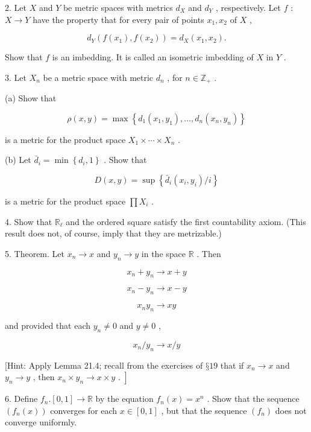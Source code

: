 2. Let \(X\) and \(Y\) be metric spaces with metrics \({d}_{X}\) and \({d}_{Y}\) , respectively. Let \(f\) : \(X \rightarrow  Y\) have the property that for every pair of points \({x}_{1},{x}_{2}\) of \(X\) ,

\[
{d}_{Y}\left( {f\left( {x}_{1}\right) ,f\left( {x}_{2}\right) }\right)  = {d}_{X}\left( {{x}_{1},{x}_{2}}\right) .
\]

Show that \(f\) is an imbedding. It is called an isometric imbedding of \(X\) in \(Y\) .

3. Let \({X}_{n}\) be a metric space with metric \({d}_{n}\) , for \(n \in  {\mathbb{Z}}_{ + }\) .

(a) Show that

\[
\rho \left( {x,y}\right)  = \max \left\{  {{d}_{1}\left( {{x}_{1},{y}_{1}}\right) ,\ldots ,{d}_{n}\left( {{x}_{n},{y}_{n}}\right) }\right\}
\]

is a metric for the product space \({X}_{1} \times  \cdots  \times  {X}_{n}\) .

(b) Let \({\bar{d}}_{i} = \min \left\{  {{d}_{i},1}\right\}\) . Show that

\[
D\left( {x,y}\right)  = \sup \left\{  {{\bar{d}}_{i}\left( {{x}_{i},{y}_{i}}\right) /i}\right\}
\]

is a metric for the product space \(\prod {X}_{i}\) .

4. Show that \({\mathbb{R}}_{\ell }\) and the ordered square satisfy the first countability axiom. (This result does not, of course, imply that they are metrizable.)

5. Theorem. Let \({x}_{n} \rightarrow  x\) and \({y}_{n} \rightarrow  y\) in the space \(\mathbb{R}\) . Then

\[
{x}_{n} + {y}_{n} \rightarrow  x + y
\]

\[
{x}_{n} - {y}_{n} \rightarrow  x - y
\]

\[
{x}_{n}{y}_{n} \rightarrow  {xy}
\]

and provided that each \({y}_{n} \neq  0\) and \(y \neq  0\) ,

\[
{x}_{n}/{y}_{n} \rightarrow  x/y
\]

[Hint: Apply Lemma 21.4; recall from the exercises of \(§{19}\) that if \({x}_{n} \rightarrow  x\) and \(\left. {{y}_{n} \rightarrow  y\text{ , then }{x}_{n} \times  {y}_{n} \rightarrow  x \times  y\text{ . }}\right\rbrack\)

6. Define \({f}_{n}.\left\lbrack  {0,1}\right\rbrack   \rightarrow  \mathbb{R}\) by the equation \({f}_{n}\left( x\right)  = {x}^{n}\) . Show that the sequence \(\left( {{f}_{n}\left( x\right) }\right)\) converges for each \(x \in  \left\lbrack  {0,1}\right\rbrack\) , but that the sequence \(\left( {f}_{n}\right)\) does not converge uniformly.

